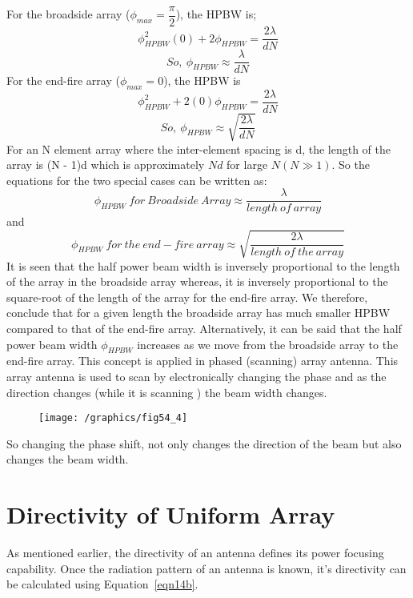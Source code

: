 For the broadside array ($\phi_{max} = \dfrac{\pi}{2}$), the HPBW is; 
$$ \phi^2_{HPBW}(0) + 2\phi_{HPBW} = \dfrac{2\lambda}{dN}$$
\begin{equation}
So, \ \phi_{HPBW} \approx \dfrac{\lambda}{dN}
\label{eqn39} 
\end{equation} 
For the end-fire array ($\phi_{max} = 0$), the HPBW is 
$$ \phi^2_{HPBW} + 2(0)\phi_{HPBW} = \dfrac{2\lambda}{dN} $$
\begin{equation}
So, \ \phi_{HPBW} \approx \sqrt{\dfrac{2\lambda}{dN}}
\label{eqn40}
\end{equation}
For an N element array where the inter-element spacing is d, the length of the array is (N - 1)d which is approximately $Nd$ for large $N(N\gg 1)$. So the equations for the two special cases can be written as: 
$$ \phi_{HPBW} \ for \ Broadside \ Array \approx \dfrac{\lambda}{length \ of \ array}$$ and
$$ \phi_{HPBW} \ for \ the \ end-fire \ array \approx \sqrt{\dfrac{2\lambda}{length \ of \  the \ array}}$$
It is seen that the half power beam width is inversely proportional to the length of the array in the broadside array whereas, it is inversely proportional to the square-root of the length of the array for the end-fire array. We therefore, conclude that for a given length the broadside array has much smaller HPBW compared to that of the end-fire array. Alternatively,
it can be said that the half power beam width $\phi_{HPBW}$ increases as we move from the broadside array to the end-fire array. This concept is applied in phased (scanning) array antenna. This array antenna is used to scan by electronically changing the phase and as the direction changes (while it is scanning ) the beam width changes.
\begin{figure}[h]
\texttt{[image: /graphics/fig54\_4]}
\centering
\caption{}
\label{54.7}
\end{figure}

So changing the phase shift, not only changes the direction of the beam but also changes the beam width. 

\section{Directivity of Uniform Array}

As mentioned earlier, the directivity of an antenna defines its power focusing capability. Once the radiation pattern of an antenna is known, it's directivity can be calculated using Equation~\ref{eqn14b}.

